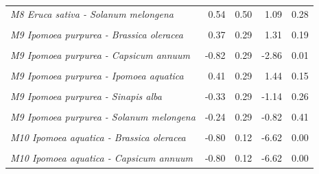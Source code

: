 \documentclass[12pt,]{article}
\begin{document}
\begin{longtable}[t]{>{}lrrrr}
\addlinespace
\em{M8 Eruca sativa - Solanum melongena} & 0.54 & 0.50 & 1.09 & 0.28\\
\addlinespace
\em{\cellcolor{gray!6}{M9 Ipomoea purpurea - (Intercept)}} & \cellcolor{gray!6}{0.82} & \cellcolor{gray!6}{0.20} & \cellcolor{gray!6}{4.05} & \cellcolor{gray!6}{0.00}\\
\addlinespace
\em{M9 Ipomoea purpurea - Brassica oleracea} & 0.37 & 0.29 & 1.31 & 0.19\\
\addlinespace
\em{\cellcolor{gray!6}{M9 Ipomoea purpurea - Brassica rapa}} & \cellcolor{gray!6}{-0.41} & \cellcolor{gray!6}{0.29} & \cellcolor{gray!6}{-1.43} & \cellcolor{gray!6}{0.16}\\
\addlinespace
\em{M9 Ipomoea purpurea - Capsicum annuum} & -0.82 & 0.29 & -2.86 & 0.01\\
\addlinespace
\em{\cellcolor{gray!6}{M9 Ipomoea purpurea - Eruca vesicaria}} & \cellcolor{gray!6}{-0.75} & \cellcolor{gray!6}{0.29} & \cellcolor{gray!6}{-2.62} & \cellcolor{gray!6}{0.01}\\
\addlinespace
\em{M9 Ipomoea purpurea - Ipomoea aquatica} & 0.41 & 0.29 & 1.44 & 0.15\\
\addlinespace
\em{\cellcolor{gray!6}{M9 Ipomoea purpurea - Petunia integrifolia}} & \cellcolor{gray!6}{-0.37} & \cellcolor{gray!6}{0.29} & \cellcolor{gray!6}{-1.31} & \cellcolor{gray!6}{0.19}\\
\addlinespace
\em{M9 Ipomoea purpurea - Sinapis alba} & -0.33 & 0.29 & -1.14 & 0.26\\
\addlinespace
\em{\cellcolor{gray!6}{M9 Ipomoea purpurea - Solanum lycopersicum}} & \cellcolor{gray!6}{-0.82} & \cellcolor{gray!6}{0.29} & \cellcolor{gray!6}{-2.86} & \cellcolor{gray!6}{0.01}\\
\addlinespace
\em{M9 Ipomoea purpurea - Solanum melongena} & -0.24 & 0.29 & -0.82 & 0.41\\
\addlinespace
\em{\cellcolor{gray!6}{M10 Ipomoea aquatica - (Intercept)}} & \cellcolor{gray!6}{0.80} & \cellcolor{gray!6}{0.09} & \cellcolor{gray!6}{9.36} & \cellcolor{gray!6}{0.00}\\
\addlinespace
\em{M10 Ipomoea aquatica - Brassica oleracea} & -0.80 & 0.12 & -6.62 & 0.00\\
\addlinespace
\em{\cellcolor{gray!6}{M10 Ipomoea aquatica - Brassica rapa}} & \cellcolor{gray!6}{-0.80} & \cellcolor{gray!6}{0.12} & \cellcolor{gray!6}{-6.62} & \cellcolor{gray!6}{0.00}\\
\addlinespace
\em{M10 Ipomoea aquatica - Capsicum annuum} & -0.80 & 0.12 & -6.62 & 0.00\\

\end{longtable}
\end{document}
